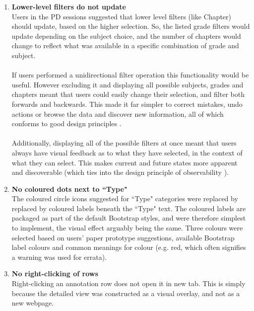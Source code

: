 \begin{enumerate}
\item \textbf{Lower-level filters do not update}\\
Users in the PD sessions suggested that lower level filters (like Chapter) should update, based on the higher selection. So, the listed grade filters would update depending on the subject choice, and the number of chapters would change to reflect what was available in a specific combination of grade and subject. \\
\\
If users performed a unidirectional filter operation this functionality would be useful. However excluding it and displaying all possible subjects, grades and chapters meant that users could easily change their selection, and filter both forwards and backwards. This made it far simpler to correct mistakes, undo actions or browse the data and discover new information, all of which conforms to good design principles \citep[p. 272]{DixFinlay}. \\
\\
Additionally, displaying all of the possible filters at once meant that users always have visual feedback as to what they have selected, in the context of what they can select. This makes current and future states more apparent and discoverable (which ties into the design principle of observability \citep[p. 270]{DixFinlay}).  

\item \textbf{No coloured dots next to ``Type"}\\
The coloured circle icons suggested for ``Type" categories were replaced by replaced by coloured labels beneath the ``Type" text.  The coloured labels are packaged as part of the default Bootstrap styles, and were therefore simplest to implement, the visual  effect arguably being the same. Three colours were selected based on users' paper prototype suggestions, available Bootstrap label colours and common meanings for colour \citep[p. 635]{Galitz} (e.g. red, which often signifies a warning was used for errata).

\item \textbf{No right-clicking of rows}\\
Right-clicking an annotation row does not open it in new tab. This is simply because the detailed view was constructed as a visual overlay, and not as a new webpage. 


\end{enumerate}
